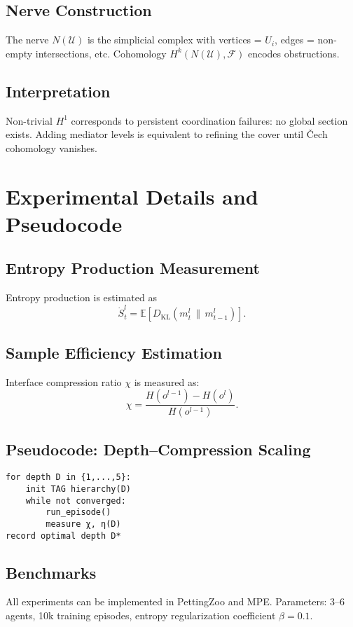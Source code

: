 \documentclass[11pt,a4paper]{article}
\begin{document}
\subsection{Nerve Construction}
The nerve $N(\mathcal{U})$ is the simplicial complex with vertices = $U_i$, edges = non-empty intersections, etc. Cohomology $H^k(N(\mathcal{U}),\mathcal{F})$ encodes obstructions.

\subsection{Interpretation}
Non-trivial $H^1$ corresponds to persistent coordination failures: no global section exists. Adding mediator levels is equivalent to refining the cover until Čech cohomology vanishes.


\section{Experimental Details and Pseudocode}
\label{app:experiments}

\subsection{Entropy Production Measurement}
Entropy production is estimated as
\[
\dot S^l_t = \mathbb{E}[ D_{\mathrm{KL}}(m^l_t \,\|\, m^l_{t-1}) ].
\]

\subsection{Sample Efficiency Estimation}
Interface compression ratio $\chi$ is measured as:
\[
\chi = \frac{H(o^{l-1}) - H(o^l)}{H(o^{l-1})}.
\]

\subsection{Pseudocode: Depth–Compression Scaling}

\begin{verbatim}
for depth D in {1,...,5}:
    init TAG hierarchy(D)
    while not converged:
        run_episode()
        measure χ, η(D)
record optimal depth D*
\end{verbatim}

\subsection{Benchmarks}
All experiments can be implemented in PettingZoo and MPE. Parameters: 3–6 agents, 10k training episodes, entropy regularization coefficient $\beta=0.1$.
\end{document}
